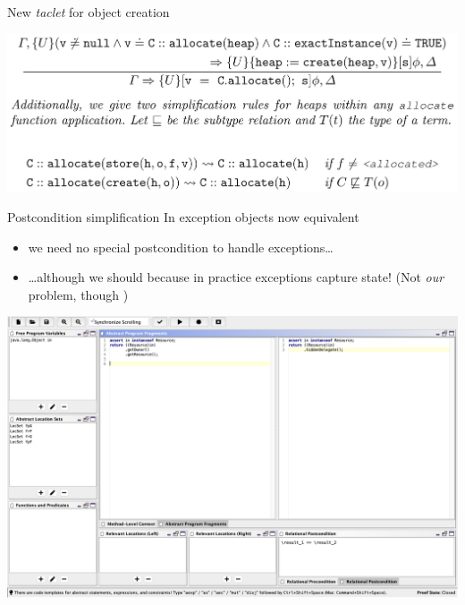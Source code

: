
\begin{frame}{New \textit{taclet} for object creation}
  \begin{center}
  \includegraphics[width=\linewidth]{imported/Definition2}
  \end{center}
\end{frame}

\begin{frame}{Postcondition simplification}
In  exception objects now equivalent
\begin{itemize}
  \item we need no special postcondition to handle exceptions\ldots
    \item \ldots although we should because in practice exceptions
      capture state! {\small (Not \emph{our} problem, though )}
  \end{itemize}
\end{frame}

\begin{frame}\vspace*{-5mm}
  \begin{center}
  \includegraphics[scale=0.25]{screenshots/HideDelegateDefaultPostcondition}
  \end{center}
\end{frame}

